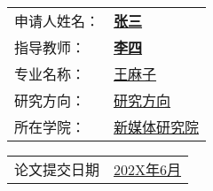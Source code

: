 \vspace{20pt}

\begin{center}
     \songti
    \begin{tabularx}{.6\textwidth}{>{\songti}l >{\songti}X<{\centering}}
        申请人姓名： & \bfseries \uline{\hfill 张三 \hfill}        \\
        指导教师：   & \bfseries \uline{\hfill 李四 \hfill} \hfill \\
        专业名称：   & \uline{\hfill 王麻子 \hfill}                \\
        研究方向：   & \uline{\hfill 研究方向 \hfill}              \\
        所在学院：   & \uline{\hfill 新媒体研究院 \hfill}          \\
    \end{tabularx}
\end{center}

\vspace{20pt}

\begin{center}
     \bfseries
    \begin{tabularx}{.5\textwidth}{>{\songti}l >{\songti}X<{\centering}}
        论文提交日期 & \uline{\hfill 202X年6月 \hfill}
    \end{tabularx}
\end{center}

\restoregeometry

